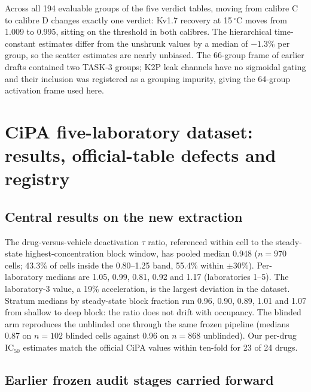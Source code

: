 \documentclass[11pt,a4paper]{article}
\begin{document}
Across all 194 evaluable groups of the five verdict tables, moving from
calibre C to calibre D changes exactly one verdict: Kv1.7 recovery at
15\,$^\circ$C moves from 1.009 to 0.995, sitting on the threshold in both
calibres. The hierarchical time-constant estimates differ from the unshrunk
values by a median of $-1.3\%$ per group, so the scatter estimates are nearly
unbiased. The 66-group frame of earlier drafts contained two TASK-3 groups;
K2P leak channels have no sigmoidal gating and their inclusion was registered
as a grouping impurity, giving the 64-group activation frame used here.

\FloatBarrier
\section{CiPA five-laboratory dataset: results, official-table defects and registry}
\label{sec:fivelab}

\subsection{Central results on the new extraction}

The drug-versus-vehicle deactivation $\tau$ ratio, referenced within cell to
the steady-state highest-concentration block window, has pooled median 0.948
($n=970$ cells; 43.3\% of cells inside the 0.80--1.25 band, 55.4\% within
$\pm30\%$). Per-laboratory medians are 1.05, 0.99, 0.81, 0.92 and 1.17
(laboratories 1--5). The laboratory-3 value, a 19\% acceleration, is the
largest deviation in the dataset. Stratum medians by steady-state block
fraction run 0.96, 0.90, 0.89, 1.01 and 1.07 from shallow to deep block: the
ratio does not drift with occupancy. The blinded arm reproduces the unblinded
one through the same frozen pipeline (medians 0.87 on $n=102$ blinded cells
against 0.96 on $n=868$ unblinded). Our per-drug IC$_{50}$ estimates match the
official CiPA values within ten-fold for 23 of 24 drugs.

\subsection{Earlier frozen audit stages carried forward}
\end{document}
